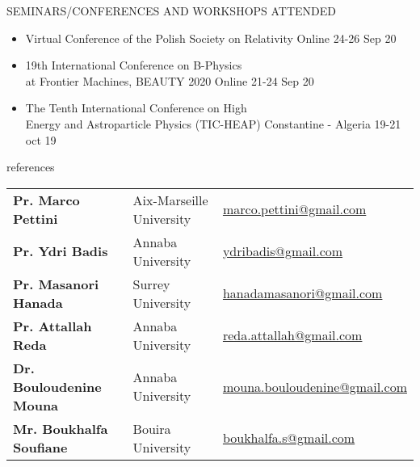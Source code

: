 \documentclass{resume} %
\begin{document}
\begin{rSection}{SEMINARS/CONFERENCES AND WORKSHOPS ATTENDED}
\begin{itemize}
\item Virtual Conference of the Polish Society on Relativity \hfill Online 24-26 Sep 20

\item 19th International Conference on B-Physics\\at Frontier Machines,  BEAUTY 2020 \hfill Online 21-24 Sep 20

\item The Tenth International Conference on High\\Energy and Astroparticle Physics (TIC-HEAP) \hfill Constantine - Algeria 19-21 oct 19

\end{itemize}


\end{rSection} 

\begin{rSection}{references}

\begin{tabular}{lll}

\textbf{Pr. Marco Pettini} & Aix-Marseille University & \href{mailto:marco.pettini@gmail.com}{marco.pettini@gmail.com}\\
\textbf{Pr. Ydri Badis} & Annaba University & \href{mailto:ydribadis@gmail.com}{ydribadis@gmail.com}\\
\textbf{Pr. Masanori Hanada} & Surrey University & \href{mailto:hanadamasanori@gmail.com}{hanadamasanori@gmail.com}\\
\textbf{Pr. Attallah Reda} & Annaba University & \href{mailto:reda.attallah@gmail.com}{reda.attallah@gmail.com}\\
\textbf{Dr. Bouloudenine Mouna} & Annaba University & \href{mailto:mouna.bouloudenine@gmail.com}{mouna.bouloudenine@gmail.com}\\
\textbf{Mr. Boukhalfa Soufiane} & Bouira University & \href{mailto:boukhalfa.s@gmail.com}{boukhalfa.s@gmail.com}

\end{tabular}

\end{rSection}
\end{document}
